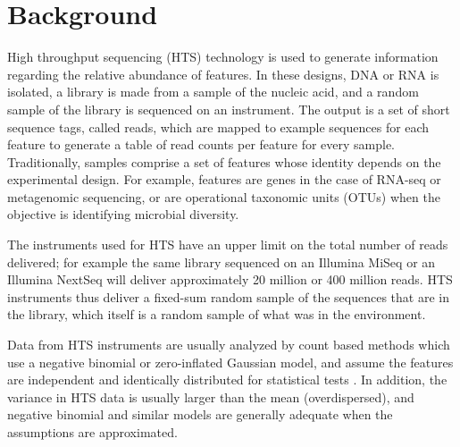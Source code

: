 \documentclass{bmcart}
\begin{document}


\section*{Background}
High throughput sequencing (HTS) technology is used to generate information regarding the relative abundance of features.  In these designs, DNA or RNA is isolated, a library is made from a  sample of the nucleic acid, and a random sample of the library is sequenced on an instrument. The output is a set of short sequence tags, called reads, which are mapped to example sequences for each feature to generate a table of read counts per feature for every sample. Traditionally, samples comprise a set of features whose identity depends on the experimental design. For example, features are genes in the case of RNA-seq or  metagenomic sequencing, or are operational taxonomic units (OTUs) when the objective is identifying microbial diversity. 
 
The instruments used for HTS have an upper limit on the total number of reads delivered; for example the same library sequenced on an Illumina MiSeq or an Illumina NextSeq will deliver approximately 20 million or 400 million reads. HTS instruments thus deliver a fixed-sum random sample of the sequences that are in the library, which itself is a random sample of what was in the environment. 

Data from HTS instruments are usually analyzed by count based methods which use a negative binomial or zero-inflated Gaussian model, and assume the features are independent and identically distributed for statistical tests \cite{Auer:2010aa,Anders:2013aa}. In addition, the variance in HTS data is usually larger than the mean (overdispersed), and negative binomial and similar models are generally adequate when the assumptions are approximated.
\end{document}

